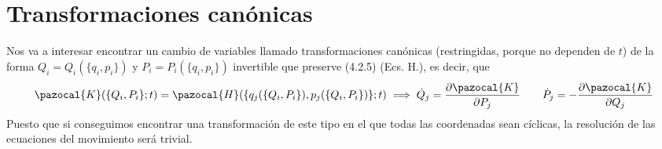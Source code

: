 \section{Transformaciones canónicas} 
Nos va a interesar encontrar un cambio de variables llamado transformaciones canónicas (restringidas, porque no dependen de $t$) de la forma $Q_i=Q_i(\{q_i,p_i\})$ y $P_i=P_i(\{q_i,p_i\})$ invertible que preserve (4.2.5) (Ecs. H.), es decir, que
\begin{equation} \label{4.2.7}
    \pazocal{K} (\{Q_i,P_i\};t) = \pazocal{H} (\{q_j(\{Q_i,P_i\}),p_j(\{Q_i,P_i\})\};t) \implies \dot{Q}_j = \frac{\partial \pazocal{K}}{\partial P_j} \ \ \ \ \ \ \dot{P}_j= -\frac{\partial \pazocal{K}}{\partial Q_j}
\end{equation} 
Puesto que si conseguimos encontrar una transformación de este tipo en el que todas las coordenadas sean cíclicas, la resolución de las ecuaciones del movimiento será trivial.
\newpage
